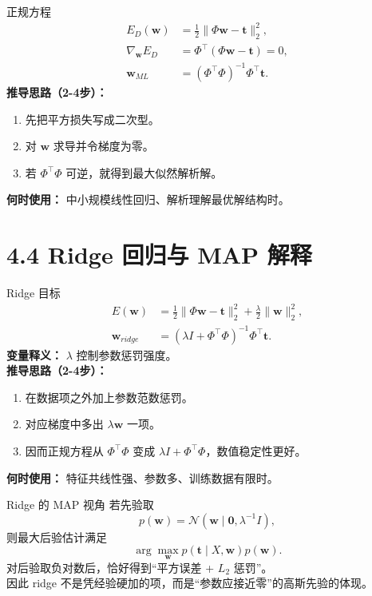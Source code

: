 ﻿\documentclass[11pt]{article}
\begin{document}
\begin{formulabox}{正规方程}
\begin{align}
E_D(\mathbf w)&=\frac12\|\Phi\mathbf w-\mathbf t\|_2^2,\\
\nabla_{\mathbf w}E_D&=\Phi^\top(\Phi\mathbf w-\mathbf t)=0,\\
\mathbf w_{ML}&=(\Phi^\top\Phi)^{-1}\Phi^\top\mathbf t.
\end{align}
\textbf{推导思路（2-4步）：}
\begin{enumerate}[leftmargin=1.6em]
  \item 先把平方损失写成二次型。
  \item 对 $\mathbf w$ 求导并令梯度为零。
  \item 若 $\Phi^\top\Phi$ 可逆，就得到最大似然解析解。
\end{enumerate}
\textbf{何时使用：} 中小规模线性回归、解析理解最优解结构时。
\end{formulabox}

\section{4.4 Ridge 回归与 MAP 解释}
\begin{formulabox}{Ridge 目标}
\begin{align}
E(\mathbf w)&=\frac12\|\Phi\mathbf w-\mathbf t\|_2^2+\frac{\lambda}{2}\|\mathbf w\|_2^2,\\
\mathbf w_{ridge}&=(\lambda I+\Phi^\top\Phi)^{-1}\Phi^\top\mathbf t.
\end{align}
\textbf{变量释义：} $\lambda$ 控制参数惩罚强度。\\
\textbf{推导思路（2-4步）：}
\begin{enumerate}[leftmargin=1.6em]
  \item 在数据项之外加上参数范数惩罚。
  \item 对应梯度中多出 $\lambda\mathbf w$ 一项。
  \item 因而正规方程从 $\Phi^\top\Phi$ 变成 $\lambda I+\Phi^\top\Phi$，数值稳定性更好。
\end{enumerate}
\textbf{何时使用：} 特征共线性强、参数多、训练数据有限时。
\end{formulabox}

\begin{derivationbox}{Ridge 的 MAP 视角}
若先验取
\[
p(\mathbf w)=\mathcal N(\mathbf w\mid \mathbf 0,\lambda^{-1}I),
\]
则最大后验估计满足
\[
\arg\max_{\mathbf w}p(\mathbf t\mid X,\mathbf w)p(\mathbf w).
\]
对后验取负对数后，恰好得到“平方误差 + $L_2$ 惩罚”。\\
因此 ridge 不是凭经验硬加的项，而是“参数应接近零”的高斯先验的体现。
\end{derivationbox}
\end{document}
